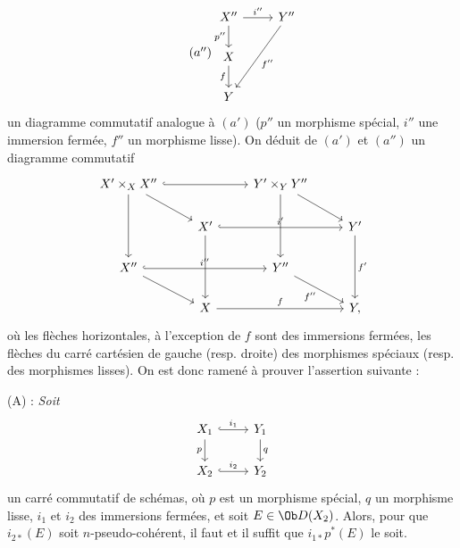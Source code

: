 \begin{equation}\tag{$a''$}
\begin{tikzcd}
X'' \arrow[r,"i''"] \arrow[d,"p''"'] & Y'' \arrow[ddl,"f''"]\\
X \arrow[d,"f"']\\
Y
\end{tikzcd}
\end{equation}
un
diagramme commutatif analogue à \((a')\) (\(p''\) un morphisme spécial, \(i''\) une immersion fermée, \(f''\) un morphisme lisse). On déduit de \((a')\) et \((a'')\) un diagramme commutatif
\[
\begin{tikzcd}
X'\times_X X'' \arrow[rr,hook] \arrow[dr] \arrow[dd] & & Y'\times_Y Y'' \arrow[dr] \arrow[dd] & \\
& X' \arrow[rr,hook,"i'"] \arrow[dd] & & Y' \arrow[dd,"f'"]\\
X'' \arrow[rr,hook,"i''"] \arrow[dr] & & Y'' \arrow[dr,"f''"'] & \\
& X \arrow[rr,"f"] & & Y,
\end{tikzcd}
\]
où les flèches horizontales, à l'exception de \(f\) sont des immersions fermées, les flèches du carré cartésien de gauche (resp. droite) des morphismes spéciaux (resp. des morphismes lisses). On est donc ramené à prouver l'assertion suivante :

(A) : \emph{Soit}
\[
\begin{tikzcd}
X_1 \arrow[r,hook,"i_1"] \arrow[d,"p"'] & Y_1 \arrow[d,"q"]\\
X_2 \arrow[r,hook,"i_2"] & Y_2
\end{tikzcd}
\]
un carré commutatif de schémas, où \(p\) est un morphisme spécial, \(q\) un morphisme lisse, \(i_1\) et \(i_2\) des immersions fermées, et soit \(E\in\Ob D(X_2)\). Alors, pour que \(i_{2*}(E)\) soit \(n\)-pseudo-cohérent, il faut et il suffit que \(i_{1*}p^*(E)\) le soit.

